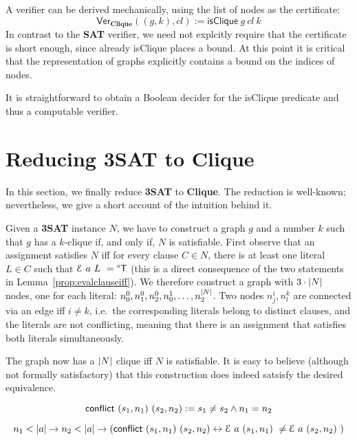 \documentclass[a4paper,UKenglish,cleveref, autoref]{lipics-v2019}
\begin{document}
A verifier can be derived mechanically, using the list of nodes as the certificate:
\[\textsf{Ver}_{\textbf{Clique}} ((g, k), cl) := \textsf{isClique}~g~cl~k \]
In contrast to the \textbf{SAT} verifier, we need not explcitly require that the certificate is short enough, since already \textsf{isClique} places a bound. At this point it is critical that the representation of graphs explicitly contains a bound on the indices of nodes.

It is straightforward to obtain a Boolean decider for the \textsf{isClique} predicate and thus a computable verifier.

\section{Reducing \textbf{3SAT} to \textbf{Clique}}
In this section, we finally reduce \textbf{3SAT} to \textbf{Clique}. The reduction is well-known; nevertheless, we give a short account of the intuition behind it. 

Given a \textbf{3SAT} instance $N$, we have to construct a graph $g$ and a number $k$ such that $g$ has a $k$-clique if, and only if, $N$ is satisfiable. First observe that an assignment satisfies $N$ iff for every clause $C \in N$, there is at least one literal $L \in C$ such that $\mathcal{E}~a~L~ = \degree\mathsf{T}$ (this is a direct consequence of the two statements in Lemma~\ref{prop:evalclauseiff}). 
We therefore construct a graph with $3 \cdot |N|$ nodes, one for each literal: $n^0_0, n^0_1, n^0_2, n^1_0, \ldots, n^{|N|}_2$. Two nodes $n^i_j, n^k_l$ are connected via an edge iff $i \neq k$, i.e.\ the corresponding literals belong to distinct clauses, and the literals are not conflicting, meaning that there is an assignment that satisfies both literals simultaneously.

The graph now has a $|N|$ clique iff $N$ is satisfiable.
It is easy to believe (although not formally satisfactory) that this construction does indeed satsisfy the desired equivalence. 

\begin{definition}
  \[\normalfont\textsf{conflict}~(s_1, n_1)~(s_2, n_2) := s_1 \neq s_2 \land n_1 = n_2 \]
\end{definition}
\begin{proposition}\label{prop:conflictingassgn}
  \[n_1 < |a| \rightarrow n_2 < |a| \rightarrow (\normalfont\textsf{conflict}~(s_1, n_1)~(s_2, n_2) \leftrightarrow \mathcal{E}~a~(s_1, n_1)~ \neq \mathcal{E}~a~(s_2, n_2)~) \]
\end{proposition}
\end{document}
